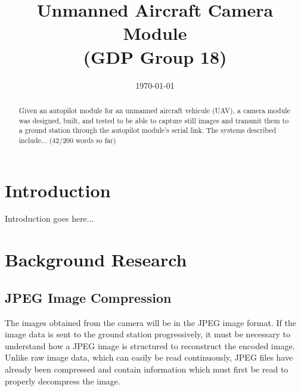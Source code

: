 \documentclass[oneside]{ecsgdp}         %
\begin{document}
\frontmatter
\title      {Unmanned Aircraft Camera Module \\(GDP Group 18)}
\date       {\today}
\subject    {ELEC6050 Group Design Project}
\maketitle
\begin{abstract}
Given an autopilot module for an unmanned aircraft vehicule (UAV), a camera module was designed, built, and tested to be able to capture still images and transmit them to a ground station through the autopilot module's serial link. The systems described include... (42/200 words so far)
\end{abstract}
\tableofcontents
\listoffigures
\listoftables
\lstlistoflistings
{}
\mainmatter

\chapter{Introduction}
Introduction goes here...


\chapter{Background Research}

\section{JPEG Image Compression}
The images obtained from the camera will be in the JPEG image format. If the image data is sent to the ground station progressively, it must be necessary to understand how a JPEG image is structured to reconstruct the encoded image. Unlike raw image data, which can easily be read continuously, JPEG files have already been compressed and contain information which must first be read to properly decompress the image.
\end{document}
